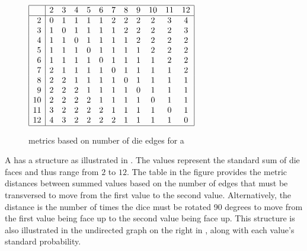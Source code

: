 \begin{tabstr}{0.75}
\begin{figure}[h]
    \begin{tabstr}{0.75}%
    $\begin{array}{|r|*{11}{c}|}%
       \hline
         & 2 & 3 & 4 & 5 & 6 & 7 & 8 & 9 & 10 & 11 & 12\\
       \hline
       2 & 0 & 1 & 1 & 1 & 1 & 2 & 2 & 2 & 2  & 3  & 4 \\
       3 & 1 & 0 & 1 & 1 & 1 & 1 & 2 & 2 & 2  & 2  & 3 \\
       4 & 1 & 1 & 0 & 1 & 1 & 1 & 1 & 2 & 2  & 2  & 2 \\
       5 & 1 & 1 & 1 & 0 & 1 & 1 & 1 & 1 & 2  & 2  & 2 \\
       6 & 1 & 1 & 1 & 1 & 0 & 1 & 1 & 1 & 1  & 2  & 2 \\
       7 & 2 & 1 & 1 & 1 & 1 & 0 & 1 & 1 & 1  & 1  & 2 \\
       8 & 2 & 2 & 1 & 1 & 1 & 1 & 0 & 1 & 1  & 1  & 1 \\
       9 & 2 & 2 & 2 & 1 & 1 & 1 & 1 & 0 & 1  & 1  & 1 \\
      10 & 2 & 2 & 2 & 2 & 1 & 1 & 1 & 1 & 0  & 1  & 1 \\
      11 & 3 & 2 & 2 & 2 & 2 & 1 & 1 & 1 & 1  & 0  & 1 \\
      12 & 4 & 3 & 2 & 2 & 2 & 2 & 1 & 1 & 1  & 1  & 0 \\
      \hline
    \end{array}$%
    \end{tabstr}%
  \caption{metrics based on number of die edges for a  \label{fig:pairdice}}
\end{figure}
\begin{example}
\label{ex:pairdice}
A  has a structure as illustrated in .
The values represent the standard sum of die faces and thus range from $2$ to $12$.
The table in the figure provides the metric distances between summed values based on the number of edges
that must be transversed to move from the first value to the second value.
Alternatively, the distance is the number of times the dice must be rotated 90 degrees to move from the first 
value being face up to the second value being face up.
This structure is also illustrated in the undirected graph on the right in ,
along with each value's standard probability.

\end{example}
\end{tabstr}
